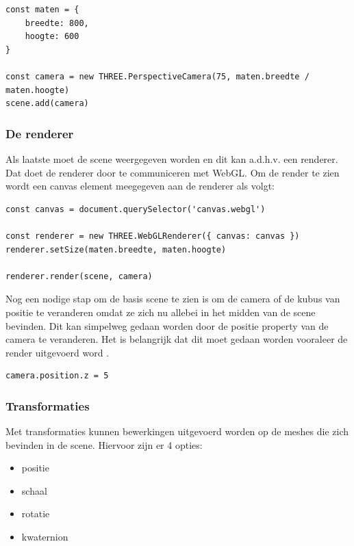 \begin{lstlisting}
const maten = {
	breedte: 800,
	hoogte: 600
}

const camera = new THREE.PerspectiveCamera(75, maten.breedte / maten.hoogte)
scene.add(camera)
\end{lstlisting}

\subsubsection{De renderer}

Als laatste moet de scene weergegeven worden en dit kan a.d.h.v. een renderer. Dat doet de renderer door te communiceren met WebGL. Om de render te zien wordt een canvas element meegegeven aan de renderer als volgt: 

\begin{lstlisting}
const canvas = document.querySelector('canvas.webgl')

const renderer = new THREE.WebGLRenderer({ canvas: canvas })
renderer.setSize(maten.breedte, maten.hoogte)

renderer.render(scene, camera)
\end{lstlisting}

Nog een nodige stap om de basis scene te zien is om de camera of de kubus van positie te veranderen omdat ze zich nu allebei in het midden van de scene bevinden. Dit kan simpelweg gedaan worden door de positie property van de camera te veranderen. Het is belangrijk dat dit moet gedaan worden vooraleer de render uitgevoerd word \autocite{Simon2023}.

\begin{lstlisting}
camera.position.z = 5
\end{lstlisting}

\subsubsection{Transformaties}

Met transformaties kunnen bewerkingen uitgevoerd worden op de meshes die zich bevinden in de scene. Hiervoor zijn er 4 opties: 

\begin{itemize}
	\item positie
	\item schaal
	\item rotatie
	\item kwaternion
\end{itemize}

